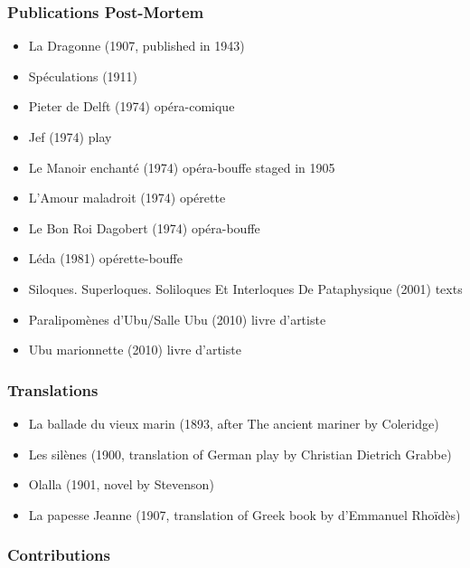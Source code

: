 \subsubsection{Publications Post-Mortem}

\begin{itemize}
  \item La Dragonne (1907, published in 1943)
  \item Spéculations (1911)
  \item Pieter de Delft (1974) opéra-comique
  \item Jef (1974) play
  \item Le Manoir enchanté (1974) opéra-bouffe staged in 1905
  \item L’Amour maladroit (1974) opérette
  \item Le Bon Roi Dagobert (1974) opéra-bouffe
  \item Léda (1981) opérette-bouffe
  \item Siloques. Superloques. Soliloques Et Interloques De Pataphysique (2001) texts
  \item Paralipomènes d'Ubu/Salle Ubu (2010) livre d'artiste
  \item Ubu marionnette (2010) livre d'artiste
\end{itemize}

\subsubsection{Translations}

\begin{itemize}
  \item La ballade du vieux marin (1893, after The ancient mariner by Coleridge)
  \item Les silènes (1900, translation of German play by Christian Dietrich Grabbe)
  \item Olalla (1901, novel by Stevenson)
  \item La papesse Jeanne (1907, translation of Greek book by d’Emmanuel Rhoïdès)
\end{itemize}

\subsubsection{Contributions}

